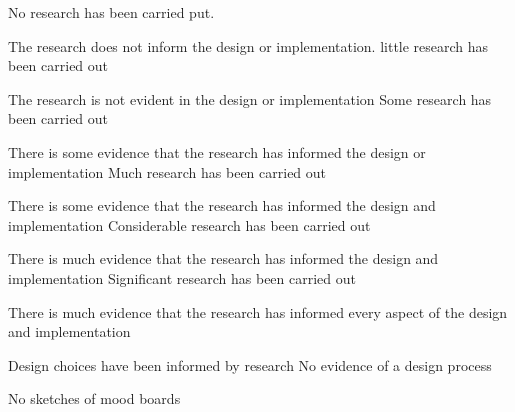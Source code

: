 \documentclass{../../fal_assignment}
\begin{document}
\begin{markingrubric}
%
%
        \grade\fail 	No research has been carried put.
            \par 		The research does not inform the design or implementation.
        \grade 		little research has been carried out
            \par 		The research is not evident in the design or implementation
        \grade 		Some research has been carried out
            \par 		There is some evidence that the research has informed the design or implementation
        \grade 		Much research has been carried out
            \par 		There is some evidence that the research has informed the design and implementation
        \grade 		Considerable research has been carried out
            \par 		There is much evidence that the research has informed the design and implementation 
        \grade 		Significant research has been carried out
            \par		There is much evidence that the research has informed every aspect of the design and implementation 
            \par		Design choices have been informed by research 
%
        \grade\fail No evidence of a design process
            \par No sketches of mood boards

\end{markingrubric}
\end{document}

